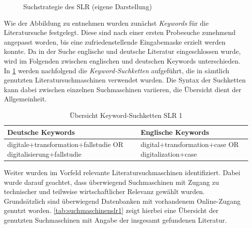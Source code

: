 \begin{figure}[H]
	\centering
	\caption[Suchstrategie des SLR]{Suchstrategie des SLR (eigene Darstellung)}
	\label{fig:suchstrategie}
\end{figure}

Wie der Abbildung zu entnehmen wurden zunächst \textit{Keywords} für die  Literatursuche festgelegt. Diese sind nach einer ersten Probesuche zunehmend angepasst worden, bis eine zufriedenstellende Eingabemaske erzielt werden konnte. Da in der Suche englische  und deutsche Literatur eingeschlossen wurde, wird im Folgenden zwischen englischen und deutschen Keywords unterschieden. In \ref{tab:keywordsslr1} werden nachfolgend die \textit{Keyword-Suchketten} aufgeführt, die in sämtlich genutzten Literatursuchmaschinen verwendet wurden. Die Syntax der Suchketten kann dabei  zwischen einzelnen Suchmaschinen variieren, die Übersicht dient der Allgemeinheit.

\begin{table}[ht]
	\centering
	\caption{Übersicht Keyword-Suchketten SLR 1}
	\begin{tabular}{|p{7cm}|p{7cm}|}
		\hline
		\textbf{Deutsche Keywords}& \textbf{Englische Keywords} \\
		\hline
		digitale+transformation+fallstudie OR digitalisierung+fallstudie   & digital+transformation+case OR digitalization+case \\
		\hline
	\end{tabular}
	\label{tab:keywordsslr1}
\end{table}

Weiter wurden im Vorfeld relevante Literatursuchmaschinen identifiziert. Dabei wurde darauf geachtet, dass überwiegend Suchmaschinen mit Zugang zu technischer und teilweise wirtschaftlicher Relevanz gewählt wurden. Grundsätzlich sind überwiegend Datenbanken mit vorhandenem Online-Zugang genutzt worden. \ref{tab:suchmaschinenslr1} zeigt hierbei  eine Übersicht der genutzten Suchmaschinen mit Angabe der insgesamt gefundenen Literatur.

